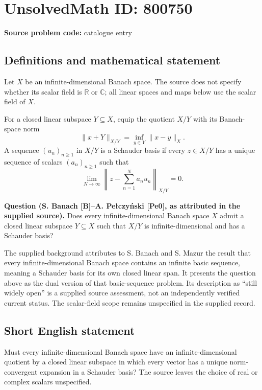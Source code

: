 \documentclass[11pt]{article}
\newcommand{\R}{\mathbb{R}}
\newcommand{\C}{\mathbb{C}}
\begin{document}
\section*{UnsolvedMath ID: 800750}
\textbf{Source problem code:} catalogue entry
\subsection{Definitions and mathematical statement}
Let \(X\) be an infinite-dimensional Banach space. The source does not specify whether its scalar field is \(\R\) or \(\C\); all linear spaces and maps below use the scalar field of \(X\).

For a closed linear subspace \(Y\subseteq X\), equip the quotient \(X/Y\) with its Banach-space norm
\[
\|x+Y\|_{X/Y}=\inf_{y\in Y}\|x-y\|_X.
\]
A sequence \((u_n)_{n\geq 1}\) in \(X/Y\) is a Schauder basis if every \(z\in X/Y\) has a unique sequence of scalars \((a_n)_{n\geq 1}\) such that
\[
\lim_{N\to\infty}\left\|z-\sum_{n=1}^{N}a_nu_n\right\|_{X/Y}=0.
\]

\textbf{Question (S. Banach [B]--A. Pe{\l}czy\'{n}ski [Pe0], as attributed in the supplied source).} Does every infinite-dimensional Banach space \(X\) admit a closed linear subspace \(Y\subseteq X\) such that \(X/Y\) is infinite-dimensional and has a Schauder basis?

The supplied background attributes to S. Banach and S. Mazur the result that every infinite-dimensional Banach space contains an infinite basic sequence, meaning a Schauder basis for its own closed linear span. It presents the question above as the dual version of that basic-sequence problem. Its description as ``still widely open'' is a supplied source assessment, not an independently verified current status. The scalar-field scope remains unspecified in the supplied record.
\subsection{Short English statement}
Must every infinite-dimensional Banach space have an infinite-dimensional quotient by a closed linear subspace in which every vector has a unique norm-convergent expansion in a Schauder basis? The source leaves the choice of real or complex scalars unspecified.
\end{document}
